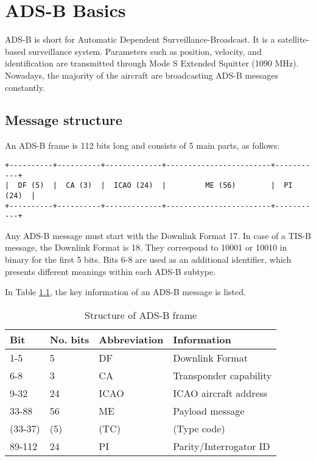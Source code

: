 \chapter{ADS-B Basics} \label{chap:adsb-basic}
ADS-B is short for Automatic Dependent Surveillance-Broadcast. It is a satellite-based surveillance system. Parameters such as position, velocity, and identification are transmitted through Mode S Extended Squitter (1090 MHz). Nowadays, the majority of the aircraft are broadcasting ADS-B messages constantly.

\section{Message structure}

An ADS-B frame is 112 bits long and consists of 5 main parts, as follows:

\begin{verbatim}
+----------+----------+-------------+------------------------+-----------+
|  DF (5)  |  CA (3)  |  ICAO (24)  |         ME (56)        |  PI (24)  |
+----------+----------+-------------+------------------------+-----------+
\end{verbatim}

Any ADS-B message must start with the Downlink Format 17. In case of a TIS-B message, the Downlink Format is 18. They correspond to 10001 or 10010 in binary for the first 5 bits. Bits 6-8 are used as an additional identifier, which presents different meanings within each ADS-B subtype.

In Table \ref{tb:adsb-structure}, the key information of an ADS-B message is listed.

\begin{table}[!ht]
\centering
\caption{Structure of ADS-B frame}
\label{tb:adsb-structure}
\begin{tabular}{|l|l|l|l|}
\hline
\textbf{Bit} & \textbf{No. bits} & \textbf{Abbreviation} & \textbf{Information} \\ \hline\hline
1-5 & 5 & DF & Downlink Format \\ \hline
6-8 & 3 & CA & Transponder capability \\ \hline
9-32 & 24 & ICAO & ICAO aircraft address \\ \hline
33-88 & 56 & ME & Payload message \\
(33-37) & (5) & (TC) & (Type code) \\ \hline
89-112 & 24 & PI & Parity/Interrogator ID \\ \hline
\end{tabular}
\end{table}

